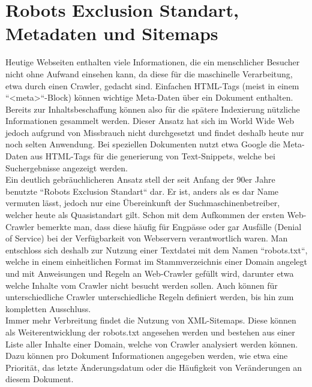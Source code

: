\section{Robots Exclusion Standart, Metadaten und Sitemaps}
Heutige Webseiten enthalten viele Informationen, die ein menschlicher Besucher nicht ohne Aufwand einsehen kann, da diese für die maschinelle Verarbeitung, etwa durch einen Crawler, gedacht sind. Einfachen HTML-Tags (meist in einem ``<meta>``-Block) können wichtige Meta-Daten über ein Dokument enthalten. Bereits zur Inhaltsbeschaffung können also für die spätere Indexierung nützliche Informationen gesammelt werden. Dieser Ansatz hat sich im World Wide Web jedoch aufgrund von Missbrauch nicht durchgesetzt und findet deshalb heute nur noch selten Anwendung. Bei speziellen Dokumenten nutzt etwa Google die Meta-Daten aus HTML-Tags für die generierung von Text-Snippets, welche bei Suchergebnisse angezeigt werden.\\
Ein deutlich gebräuchlicheren Ansatz stell der seit Anfang der 90er Jahre benutzte ``Robots Exclusion Standart`` dar. Er ist, anders als es dar Name vermuten lässt, jedoch nur eine Übereinkunft der Suchmaschinenbetreiber, welcher heute als Quasistandart gilt. Schon mit dem Aufkommen der ersten Web-Crawler bemerkte man, dass diese häufig für Engpässe oder gar Ausfälle (Denial of Service) bei der Verfügbarkeit von Webservern verantwortlich waren. Man entschloss sich deshalb zur Nutzung einer Textdatei mit dem Namen ``robots.txt``, welche in einem einheitlichen Format im Stammverzeichnis einer Domain angelegt und mit Anweisungen und Regeln an Web-Crawler gefüllt wird, darunter etwa welche Inhalte vom Crawler nicht besucht werden sollen. Auch können für unterschiedliche Crawler unterschiedliche Regeln definiert werden, bis hin zum kompletten Ausschluss.\\
Immer mehr Verbreitung findet die Nutzung von XML-Sitemaps. Diese können als Weiterentwicklung der robots.txt angesehen werden und bestehen aus einer Liste aller Inhalte einer Domain, welche von Crawler analysiert werden können. Dazu können pro Dokument Informationen angegeben werden, wie etwa eine Priorität, das letzte Änderungsdatum oder die Häufigkeit von Veränderungen an diesem Dokument.\\
